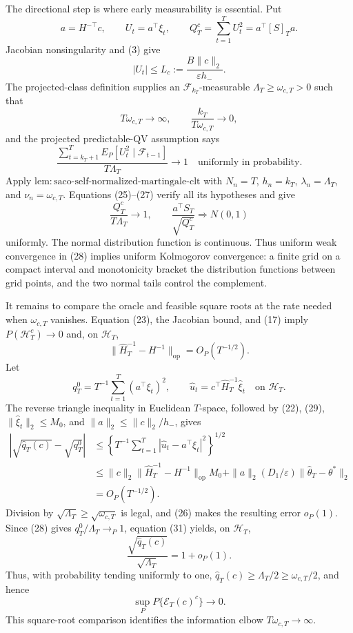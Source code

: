 The directional step is where early measurability is essential.  Put
\[
 a=H^{-\top}c,\qquad U_t=a^\top\xi_t,\qquad
 Q_T^c=\sum_{t=1}^TU_t^2=a^\top[S]_Ta.
\tag{24}
\]
Jacobian nonsingularity and (3) give
\[
 |U_t|\le L_c:=\frac{B\|c\|_2}{\varepsilon h_-}.
\tag{25}
\]
The projected-class definition supplies an \(\mathcal F_{k_T}\)-measurable
\(\Lambda_T\ge\omega_{c,T}>0\) such that
\[
 T\omega_{c,T}\longrightarrow\infty,
 \qquad \frac{k_T}{T\omega_{c,T}}\longrightarrow0,
\tag{26}
\]
and the projected predictable-QV assumption says
\[
 \frac{\sum_{t=k_T+1}^TE_P[U_t^2\mid\mathcal F_{t-1}]}
 {T\Lambda_T}\longrightarrow1
 \quad\text{uniformly in probability}.
\tag{27}
\]
Apply \(\mathrm{lem:saco\text{-}self\text{-}normalized\text{-}martingale\text{-}clt}\)
with \(N_n=T\), \(h_n=k_T\), \(\lambda_n=\Lambda_T\), and
\(\nu_n=\omega_{c,T}\).  Equations (25)--(27) verify all its hypotheses and
give
\[
 \frac{Q_T^c}{T\Lambda_T}\longrightarrow1,
 \qquad \frac{a^\top S_T}{\sqrt{Q_T^c}}\Rightarrow N(0,1)
\tag{28}
\]
uniformly.  The normal distribution function is continuous.  Thus uniform
weak convergence in (28) implies uniform Kolmogorov convergence: a finite
grid on a compact interval and monotonicity bracket the distribution
functions between grid points, and the two normal tails control the
complement.

It remains to compare the oracle and feasible square roots at the rate needed
when \(\omega_{c,T}\) vanishes.  Equation (23), the Jacobian bound, and (17)
imply \(P(\mathcal H_T^c)\to0\) and, on \(\mathcal H_T\),
\[
 \|\widehat H_T^{-1}-H^{-1}\|_{\mathrm{op}}=O_P(T^{-1/2}).
\tag{29}
\]
Let
\[
 q_T^0=T^{-1}\sum_{t=1}^T(a^\top\xi_t)^2,
 \qquad \widehat u_t=c^\top\widehat H_T^{-1}\widehat\xi_t
 \quad\text{on }\mathcal H_T.
\tag{30}
\]
The reverse triangle inequality in Euclidean \(T\)-space, followed by (22),
(29), \(\|\widehat\xi_t\|_2\le M_0\), and
\(\|a\|_2\le\|c\|_2/h_-\), gives
\[
 \begin{aligned}
 \left|\sqrt{\widehat q_T(c)}-\sqrt{q_T^0}\right|
 &\le\left\{T^{-1}\sum_{t=1}^T
 |\widehat u_t-a^\top\xi_t|^2\right\}^{1/2}\\
 &\le \|c\|_2\|\widehat H_T^{-1}-H^{-1}\|_{\mathrm{op}}M_0
 +\|a\|_2(D_1/\varepsilon)\|\widehat\theta_T-\theta^*\|_2\\
 &=O_P(T^{-1/2}).
 \end{aligned}
\tag{31}
\]
Division by \(\sqrt{\Lambda_T}\ge\sqrt{\omega_{c,T}}\) is legal, and (26)
makes the resulting error \(o_P(1)\).  Since (28) gives
\(q_T^0/\Lambda_T\to_P1\), equation (31) yields, on \(\mathcal H_T\),
\[
 \frac{\sqrt{\widehat q_T(c)}}{\sqrt{\Lambda_T}}=1+o_P(1).
\tag{32}
\]
Thus, with probability tending uniformly to one,
\(\widehat q_T(c)\ge\Lambda_T/2\ge\omega_{c,T}/2\), and hence
\[
 \sup_P P\{\mathcal E_T(c)^c\}\longrightarrow0.
\tag{33}
\]
This square-root comparison identifies the information elbow
\(T\omega_{c,T}\to\infty\).

